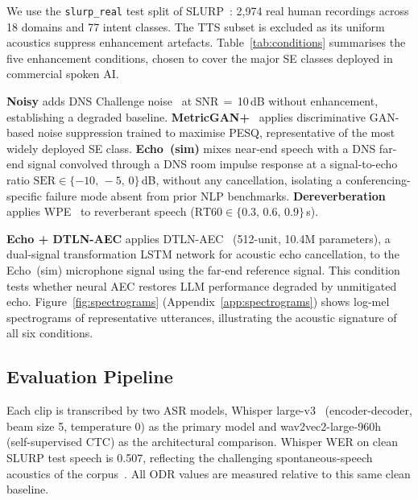 \documentclass[11pt]{article}
\begin{document}
We use the \texttt{slurp\_real} test split of
SLURP~\citep{bastianelli2020slurp}: 2{,}974 real human recordings
across 18 domains and 77 intent classes.
The TTS subset is excluded as its uniform acoustics suppress
enhancement artefacts.
Table~\ref{tab:conditions} summarises the five enhancement conditions,
chosen to cover the major SE classes deployed in commercial spoken AI.

\textbf{Noisy} adds DNS Challenge noise~\citep{reddy2021interspeech} at
SNR$\,=\,$10\,dB without enhancement, establishing a degraded
baseline.
\textbf{MetricGAN{+}}~\citep{fu2021metricgan+} applies discriminative
GAN-based noise suppression trained to maximise PESQ, representative
of the most widely deployed SE class.
\textbf{Echo~(sim)} mixes near-end speech with a DNS far-end signal
convolved through a DNS room impulse response at a
signal-to-echo ratio $\text{SER}\!\in\!\{-10,\,-5,\,0\}$\,dB, without
any cancellation, isolating a conferencing-specific failure mode
absent from prior NLP benchmarks.
\textbf{Dereverberation} applies WPE~\citep{nakatani2010speech} to
reverberant speech ($\text{RT60}\!\in\!\{0.3,\,0.6,\,0.9\}$\,s).

\textbf{Echo + DTLN-AEC} applies DTLN-AEC~\citep{westhausen2021acoustic}
(512-unit, 10.4M parameters), a dual-signal transformation LSTM
network for acoustic echo cancellation, to the Echo~(sim) microphone
signal using the far-end reference signal.
This condition tests whether neural AEC restores LLM
performance degraded by unmitigated echo.
Figure~\ref{fig:spectrograms} (Appendix~\ref{app:spectrograms}) shows
log-mel spectrograms of representative utterances, illustrating the acoustic signature of all six conditions.
 
\subsection{Evaluation Pipeline}
 
Each clip is transcribed by two ASR models, Whisper
large-v3~\citep{radford2023robust} (encoder-decoder, beam size 5,
temperature 0) as the primary model and wav2vec2-large-960h~\citep{baevski2020wav2vec}
(self-supervised CTC) as the architectural comparison.
Whisper WER on clean SLURP test speech is 0.507, reflecting the
challenging spontaneous-speech acoustics of the corpus~\citep{bastianelli2020slurp}.
All ODR values are measured relative to this same clean baseline.


\end{document}
